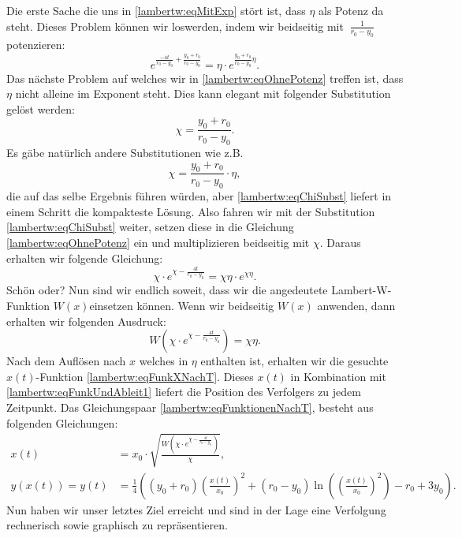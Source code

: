 Die erste Sache die uns in \eqref{lambertw:eqMitExp} stört ist, dass \(\eta\) als Potenz da steht. Dieses Problem können wir loswerden, indem wir beidseitig mit \(\:\displaystyle \frac{1}{r_0-y_0}\:\) potenzieren:
\begin{equation}
	e^{\displaystyle \frac{-4t}{r_0-y_0}+\frac{y_0+r_0}{r_0-y_0}}
	=
	\eta\cdot e^{\displaystyle \frac{y_0+r_0}{r_0-y_0}\eta} .
	\label{lambertw:eqOhnePotenz}
\end{equation}
Das nächste Problem auf welches wir in \eqref{lambertw:eqOhnePotenz} treffen ist, dass \(\eta\) nicht alleine im Exponent steht. Dies kann elegant mit folgender Substitution gelöst werden:
\begin{equation}
	\chi
	=
	\frac{y_0+r_0}{r_0-y_0}.
	\label{lambertw:eqChiSubst}
\end{equation}
Es gäbe natürlich andere Substitutionen wie z.B. 
\[\displaystyle \chi=\frac{y_0+r_0}{r_0-y_0}\cdot\eta,\] 
die auf das selbe Ergebnis führen würden, aber \eqref{lambertw:eqChiSubst} liefert in einem Schritt die kompakteste Lösung. Also fahren wir mit der  Substitution \eqref{lambertw:eqChiSubst} weiter, setzen diese in die Gleichung \eqref{lambertw:eqOhnePotenz} ein und multiplizieren beidseitig mit \(\chi\). Daraus erhalten wir folgende Gleichung:
\begin{equation}
	\chi\cdot e^{\displaystyle \chi-\frac{4t}{r_0-y_0}}
	=
	\chi\eta\cdot e^{\displaystyle \chi\eta}.
	\label{lambertw:eqNachSubst}
\end{equation}
Schön oder? Nun sind wir endlich soweit, dass wir die angedeutete Lambert-W-Funktion \(W(x)\)einsetzen können. Wenn wir beidseitig \(W(x)\) anwenden, dann erhalten wir folgenden Ausdruck:
\begin{equation}
	W\left(\chi\cdot e^{\displaystyle \chi-\frac{4t}{r_0-y_0}}\right)
	=
	\chi\eta.
\end{equation}
Nach dem Auflösen nach \(x\) welches in \(\eta\) enthalten ist, erhalten wir die gesuchte \(x(t)\)-Funktion \eqref{lambertw:eqFunkXNachT}. Dieses \(x(t)\) in Kombination mit \eqref{lambertw:eqFunkUndAbleit1} liefert die Position des Verfolgers zu jedem Zeitpunkt. Das Gleichungspaar \eqref{lambertw:eqFunktionenNachT}, besteht aus folgenden Gleichungen:
\begin{subequations}
	\begin{align}
		\label{lambertw:eqFunkXNachT}
		x(t)
		&=
		x_0\cdot\sqrt{\frac{W\left(\chi\cdot e^{\displaystyle \chi-\frac{4t}{r_0-y_0}}\right)}{\chi}}, \\
		\label{lambertw:eqFunkYNachT}
		y(x(t))
		=
		y(t)
		&=
		\frac{1}{4}\left(\left(y_0+r_0\right)\left(\frac{x(t)}{x_0}\right)^2+\left(r_0-y_0\right)\operatorname{ln}\left(\left(\frac{x(t)}{x_0}\right)^2\right)-r_0+3y_0\right).
	\end{align}
	\label{lambertw:eqFunktionenNachT}
\end{subequations}
Nun haben wir unser letztes Ziel erreicht und sind in der Lage eine Verfolgung rechnerisch sowie graphisch zu repräsentieren.
 
